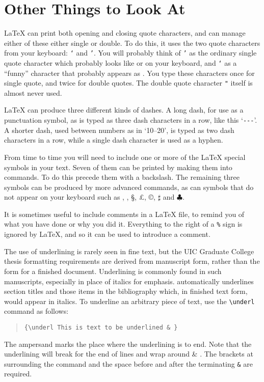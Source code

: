 \section{Other Things to Look At}
\LaTeX{} can print both opening and closing quote characters,
and can manage either of these either single or double.
To do this, it uses the two quote characters from your keyboard:
{\tt `} and {\tt '}.
You will probably think of
{\tt '} as the ordinary single quote character which probably looks like
{\tt{}} or {\tt{}} on your keyboard,
and {\tt `} as a ``funny''
character that probably appears as {\tt{}}.
You type these characters once for single quote, and twice for
double quotes. The double quote character {\tt "} itself
is almost never used.
 
\LaTeX{} can produce three different kinds of dashes.
A long dash, for use as a punctuation symbol, as is typed as three dash
characters in a row, like this `\verb+---+'.  A shorter dash,
used between numbers as in `10--20', is typed as two dash
characters in a row, while a single dash character is used as a hyphen.
 
From time to time you will need to include one or more of the \LaTeX{}
special symbols in your text.  Seven of them can be printed by
making them into commands.
To do this precede them with a backslash.
The remaining three symbols can be produced by more
advanced commands, as can symbols that do not appear on your keyboard
such as \dag, \ddag, \S, \pounds, \copyright, $\sharp$ and $\clubsuit$.
 
It is sometimes useful to include comments in a \LaTeX{} file, to remind
you of what you have done or why you did it.  Everything to the
right of a \verb+%+ sign is ignored by \LaTeX{}, and so it can
be used to introduce a comment.
 
The use of underlining is rarely seen in fine text, but the
UIC Graduate College thesis formatting requirements are derived from
manuscript form, rather than the form for a finished document.
Underlining is commonly found in such manuscripts, especially in place
of italics for emphasis.
\uicthesi{} automatically underlines section titles and those items in the
bibliography which, in finished text form, would appear in italics.
To underline an arbitrary piece of text, use the \verb+\underl+ command
as follows:
\begin{quote}\begin{verbatim}
{\underl This is text to be underlined & }
\end{verbatim}\end{quote}
The ampersand marks the place where the underlining is to end.
{\underl Note that the underlining will break for the end of lines
and wrap around & }.
The brackets at surrounding the command and the space before and after
the terminating \verb+&+ are required.
 
